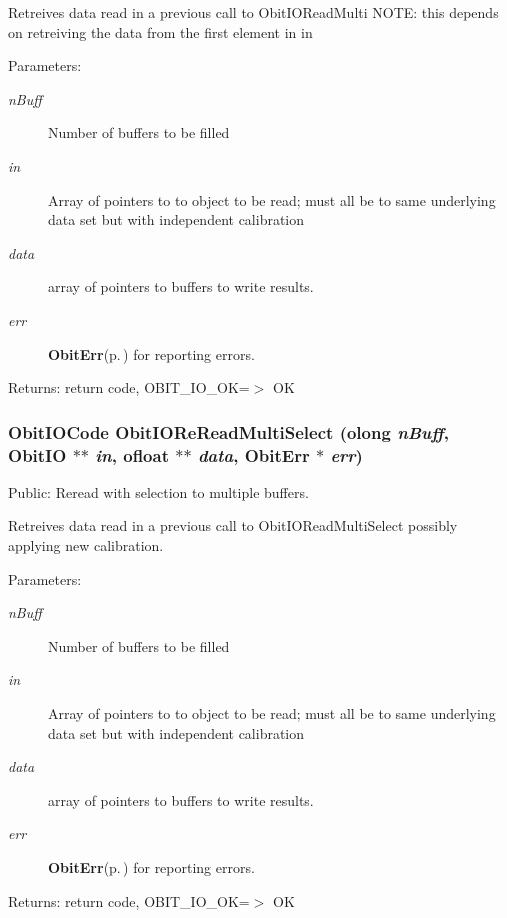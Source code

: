 Retreives data read in a previous call to Obit\-IORead\-Multi NOTE: this depends on retreiving the data from the first element in in \begin{Desc}
\item[Parameters:]
\begin{description}
\item[{\em n\-Buff}]Number of buffers to be filled \item[{\em in}]Array of pointers to to object to be read; must all be to same underlying data set but with independent calibration \item[{\em data}]array of pointers to buffers to write results. \item[{\em err}]{\bf Obit\-Err}{\rm (p.\,\pageref{structObitErr})} for reporting errors. \end{description}
\end{Desc}
\begin{Desc}
\item[Returns:]return code, OBIT\_\-IO\_\-OK=$>$ OK \end{Desc}
\subsubsection{\setlength{\rightskip}{0pt plus 5cm}Obit\-IOCode Obit\-IORe\-Read\-Multi\-Select ({\bf olong} {\em n\-Buff}, {\bf Obit\-IO} $\ast$$\ast$ {\em in}, {\bf ofloat} $\ast$$\ast$ {\em data}, {\bf Obit\-Err} $\ast$ {\em err})}\label{ObitIO_8c_a21}


Public: Reread with selection to multiple buffers. 

Retreives data read in a previous call to Obit\-IORead\-Multi\-Select possibly applying new calibration. \begin{Desc}
\item[Parameters:]
\begin{description}
\item[{\em n\-Buff}]Number of buffers to be filled \item[{\em in}]Array of pointers to to object to be read; must all be to same underlying data set but with independent calibration \item[{\em data}]array of pointers to buffers to write results. \item[{\em err}]{\bf Obit\-Err}{\rm (p.\,\pageref{structObitErr})} for reporting errors. \end{description}
\end{Desc}
\begin{Desc}
\item[Returns:]return code, OBIT\_\-IO\_\-OK=$>$ OK \end{Desc}
